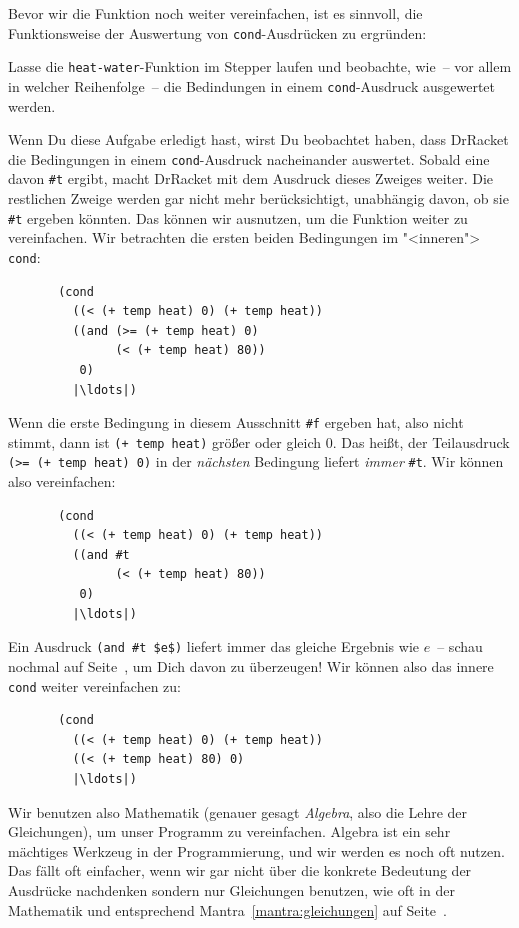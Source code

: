 Bevor wir die Funktion noch weiter vereinfachen, ist es sinnvoll, die
Funktionsweise der Auswertung von \lstinline{cond}-Ausdrücken zu ergründen:
%
\begin{aufgabeinline}
  Lasse die \lstinline{heat-water}-Funktion im Stepper laufen und
  beobachte, wie~-- vor allem in welcher Reihenfolge~-- die Bedindungen
  in einem \lstinline{cond}-Ausdruck ausgewertet werden.
\end{aufgabeinline}
%
Wenn Du diese Aufgabe erledigt hast, wirst Du beobachtet haben, dass DrRacket
die Bedingungen in einem \lstinline{cond}-Ausdruck nacheinander
auswertet.  Sobald eine davon \lstinline{#t} ergibt, macht DrRacket mit dem
Ausdruck dieses Zweiges weiter.  Die restlichen Zweige werden gar nicht
mehr berücksichtigt, unabhängig davon, ob sie \lstinline{#t} ergeben
könnten.
Das können wir ausnutzen, um die Funktion weiter zu vereinfachen.
Wir betrachten die ersten beiden Bedingungen im "<inneren">
\lstinline{cond}:
%
\begin{lstlisting}
       (cond
         ((< (+ temp heat) 0) (+ temp heat))
         ((and (>= (+ temp heat) 0)
               (< (+ temp heat) 80))
          0)
         |\ldots|)
\end{lstlisting}
%
Wenn die erste Bedingung in diesem Ausschnitt \lstinline{#f} ergeben hat, also nicht stimmt,
dann ist \lstinline{(+ temp heat)} größer oder gleich 0.  Das heißt, der
Teilausdruck \lstinline{(>= (+ temp heat) 0)} in der \emph{nächsten}
Bedingung liefert \emph{immer} \lstinline{#t}.  Wir können also
vereinfachen:
%
\begin{lstlisting}
       (cond
         ((< (+ temp heat) 0) (+ temp heat))
         ((and #t
               (< (+ temp heat) 80))
          0)
         |\ldots|)
\end{lstlisting}
%
Ein Ausdruck \lstinline{(and #t $e$)} liefert immer das gleiche Ergebnis
wie \(e\)~-- schau nochmal auf Seite~\pageref{page:and}, um Dich davon
zu überzeugen!  Wir können also das innere \lstinline{cond} weiter
vereinfachen zu:

\begin{lstlisting}
       (cond
         ((< (+ temp heat) 0) (+ temp heat))
         ((< (+ temp heat) 80) 0)
         |\ldots|)
\end{lstlisting}
%
\label{page:bedingungen-vereinfachen}
Wir benutzen also Mathematik (genauer gesagt
\textit{Algebra}, also die Lehre der Gleichungen), um
unser Programm zu vereinfachen.  Algebra ist ein sehr mächtiges
Werkzeug in der Programmierung, und wir werden es noch oft nutzen.
Das fällt oft einfacher, wenn wir gar nicht über die konkrete
Bedeutung der Ausdrücke nachdenken sondern nur Gleichungen benutzen,
wie oft in der Mathematik und entsprechend
Mantra~\ref{mantra:gleichungen} auf Seite~\pageref{mantra:gleichungen}.

